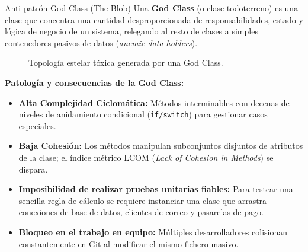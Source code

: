 \begin{definicion}{Anti-patrón God Class (The Blob)}
Una \textbf{God Class} (o clase todoterreno) es una clase que concentra una cantidad desproporcionada de responsabilidades, estado y lógica de negocio de un sistema, relegando al resto de clases a simples contenedores pasivos de datos (\emph{anemic data holders}).
\end{definicion}

\begin{figure}[htbp]
\centering
{}
\caption{Topología estelar tóxica generada por una God Class.}
\label{fig:god-class}
\end{figure}

\textbf{Patología y consecuencias de la God Class:}
\begin{itemize}[leftmargin=1.5em]
  \item \textbf{Alta Complejidad Ciclomática:} Métodos interminables con decenas de niveles de anidamiento condicional (\texttt{if/switch}) para gestionar casos especiales.
  \item \textbf{Baja Cohesión:} Los métodos manipulan subconjuntos disjuntos de atributos de la clase; el índice métrico LCOM (\emph{Lack of Cohesion in Methods}) se dispara.
  \item \textbf{Imposibilidad de realizar pruebas unitarias fiables:} Para testear una sencilla regla de cálculo se requiere instanciar una clase que arrastra conexiones de base de datos, clientes de correo y pasarelas de pago.
  \item \textbf{Bloqueo en el trabajo en equipo:} Múltiples desarrolladores colisionan constantemente en Git al modificar el mismo fichero masivo.
\end{itemize}


